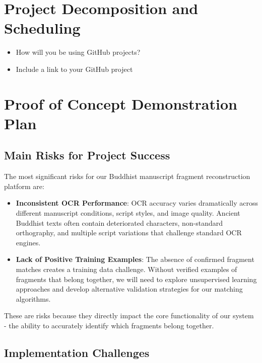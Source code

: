 \documentclass{article}
\begin{document}
\section{Project Decomposition and Scheduling}

\begin{itemize}
  \item How will you be using GitHub projects?
  \item Include a link to your GitHub project
\end{itemize}


\section{Proof of Concept Demonstration Plan}

\subsection{Main Risks for Project Success}

The most significant risks for our Buddhist manuscript fragment reconstruction platform are:

\begin{itemize}
\item \textbf{Inconsistent OCR Performance}: OCR accuracy varies dramatically across different manuscript conditions, script styles, and image quality. Ancient Buddhist texts often contain deteriorated characters, non-standard orthography, and multiple script variations that challenge standard OCR engines.


\item \textbf{Lack of Positive Training Examples}: The absence of confirmed fragment matches creates a training data challenge. Without verified examples of fragments that belong together, we will need to explore unsupervised learning approaches and develop alternative validation strategies for our matching algorithms.
\end{itemize}

These are risks because they directly impact the core functionality of our system - the ability to accurately identify which fragments belong together.

\subsection{Implementation Challenges}
\end{document}
